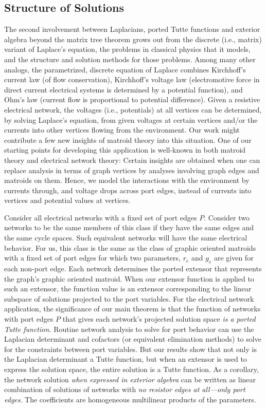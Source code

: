 \documentclass[12pt]{article}
\theoremstyle{definition}
\begin{document}
\subsection{Structure of Solutions}

The second involvement between Laplacians, ported Tutte functions and exterior
algebra beyond the matrix tree theorem grows out from the 
discrete (i.e., matrix)
variant of Laplace's equation, the problems in classical physics that it
models, and the structure and solution methods for those problems.
Among many other analogs, the parametrized, discrete equation 
of Laplace combines Kirchhoff's current law (of flow conservation),  Kirchhoff's 
voltage law (electromotive force 
in direct current electrical systems is determined by a potential function),
and Ohm's law (current flow is proportional to potential difference).  
Given a resistive electrical network, the voltages (i.e., potentials)
at all vertices can be determined, by solving Laplace's equation, 
from given voltages at certain vertices and/or the currents into 
other vertices flowing from the environment.
Our work might contribute a few new insights of matroid theory into this 
situation.  One of our starting points for developing this application
is well-known in both matroid theory and electrical network theory:
Certain insights are obtained when one can replace analysis in terms
of graph vertices by analyses involving graph edges and matroids on
them.  Hence, we model the interactions with the environment
by currents through, and voltage drops across port edges, instead of
currents into vertices and potential values at vertices.

Consider all electrical networks with a fixed set of port edges $P$.
Consider two networks to be the same members of this class 
if they have the same edges and the
same cycle spaces.  Such equivalent networks will have the same
electrical behavior.
For us, this class is the same as the class of graphic oriented 
matroids with a fixed set of port edges for which two parameters, $r_e$ and
$g_e$ are given for each non-port edge.  Each network determines
the ported extensor that represents the graph's graphic oriented matroid.
When our extensor function is applied to such an extensor, the
function value is an extensor corresponding to the linear
subspace of solutions projected to the port variables.
For the electrical network application,
the significance of our main theorem 
is that the function of networks with port edges $P$
that gives each network's projected solution space
\textit{is a ported Tutte function.}  Routine network analysis
to solve for port behavior can use the Laplacian determinant and cofactors 
(or equivalent elimination methods) to solve for the constraints between 
port variables.
But our results show that not only is
the Laplacian determinant a Tutte function, but when an extensor
is used to express the solution space, the entire solution
is a Tutte function.
As a corollary, the network solution \emph{when expressed in exterior
algebra} can be written as linear combination of solutions of networks
with \emph{no resistor edges at all---only port edges}.  The coefficients
are homogeneous multilinear products of the parameters.
\end{document}

